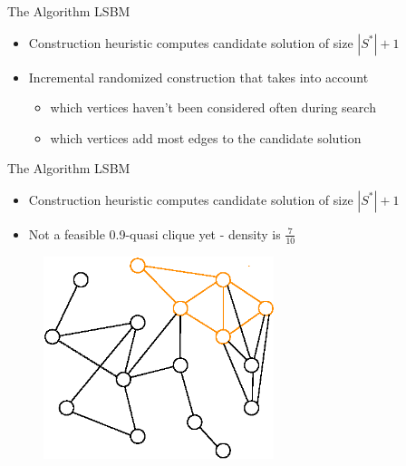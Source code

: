 \documentclass{beamer}
\begin{document}
\begin{frame}{The Algorithm LSBM}
    \begin{itemize}
        \item<1-> Construction heuristic computes candidate solution of size $|S^*|+1$
        \item<2-> Incremental randomized construction that takes into account
        \begin{itemize}
            \item<3-> which vertices haven't been considered often during search
            \item<4-> which vertices add most edges to the candidate solution
        \end{itemize}
    \end{itemize}
     
\end{frame}

\begin{frame}{The Algorithm LSBM}
    \begin{itemize}
        \item Construction heuristic computes candidate solution of size $|S^*|+1$
        \item Not a feasible 0.9-quasi clique yet - density is $\frac{7}{10}$
    \end{itemize}
    \begin{figure}
        \centering
        \includegraphics[width=0.6\textwidth]{graphics/algorithm_poster_2.eps}
    \end{figure}
\end{frame}
\end{document}
